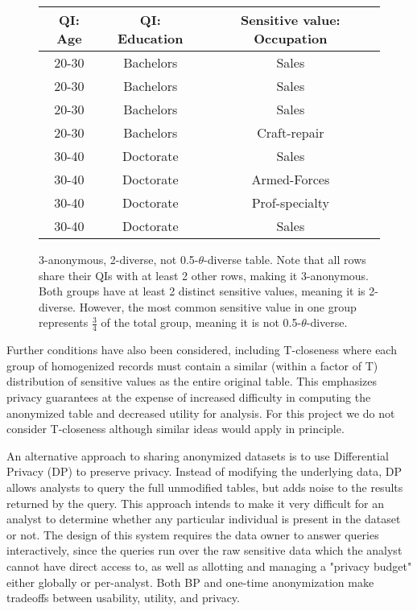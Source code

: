 \begin{figure*}
\centering
\begin{tabular}{|c|c|c|}
\hline
QI: Age & QI: Education & Sensitive value: Occupation  \\
\hline
\hline
20-30 & Bachelors & Sales \\
\hline
20-30 & Bachelors & Sales  \\
\hline
20-30 & Bachelors & Sales  \\
\hline
20-30 & Bachelors & Craft-repair  \\
\hline
30-40 & Doctorate & Sales  \\
\hline
30-40 & Doctorate & Armed-Forces  \\
\hline
30-40 & Doctorate & Prof-specialty  \\
\hline
30-40 & Doctorate & Sales  \\
\hline
\end{tabular}
\caption{3-anonymous, 2-diverse, not 0.5-$\theta$-diverse table. Note that all rows share their QIs with at least 2 other rows, making it 3-anonymous. Both groups have at least 2 distinct sensitive values, meaning it is 2-diverse. However, the most common sensitive value in one group represents $\frac{3}{4}$ of the total group, meaning it is not 0.5-$\theta$-diverse.}
\label{fig:diverseTable}
\end{figure*}

Further conditions have also been considered, including T-closeness\cite{litCloseness} where each group of homogenized records must contain a similar (within a factor of T) distribution of sensitive values as the entire original table. This emphasizes privacy guarantees at the expense of increased difficulty in computing the anonymized table and decreased utility for analysis. For this project we do not consider T-closeness although similar ideas would apply in principle.

An alternative approach to sharing anonymized datasets is to use Differential Privacy\cite{dworkDifferential} (DP) to preserve privacy. Instead of modifying the underlying data, DP allows analysts to query the full unmodified tables, but adds noise to the results returned by the query. This approach intends to make it very difficult for an analyst to determine whether any particular individual is present in the dataset or not. The design of this system requires the data owner to answer queries interactively, since the queries run over the raw sensitive data which the analyst cannot have direct access to, as well as allotting and managing a "privacy budget" either globally or per-analyst. Both BP and one-time anonymization make tradeoffs between usability, utility, and privacy.

